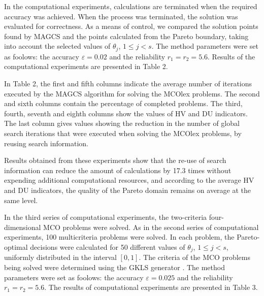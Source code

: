 \documentclass[smallextended]{svjour3}       %
\begin{document}
In the computational experiments, calculations are terminated when the required accuracy was achieved. When the process was terminated, the solution was evaluated for correctness. As a means of control, we compared the solution points found by MAGCS and the points calculated from the Pareto boundary, taking into account the selected values of $\theta_j$, $1 \leq j < s$. The method parameters were set as foolows: the accuracy $\varepsilon = 0.02$ and the reliability $r_1=r_2=5.6$. Results of the computational experiments are presented in Table 2.

In Table 2, the first and fifth columns indicate the average number of iterations executed by the MAGCS algorithm for solving the MCOlex problems. The second and sixth columns contain the percentage of completed problems. The third, fourth, seventh and eighth columns show the values of HV and DU indicators. The last column gives values showing the reduction in the number of global search iterations that were executed when solving the MCOlex problems, by reusing search information.


\begin{table}[ht]
\centering
\caption{Results of the series of experiments to solve two-dimensional two-criteria MCO problems}
\label{tab:2}
\end{table}


Results obtained from these experiments show that the re-use of search information can reduce the amount of calculations by 17.3 times without expending additional computational resources, and according to the average HV and DU indicators, the quality of the Pareto domain remains on average at the same level.

In the third series of computational experiments, the two-criteria four-dimensional MCO problems were solved. As in the second series of computational experiments, 100 multicriteria problems were solved. In each problem, the Pareto-optimal decisions were calculated for 50 different values of $\theta_j$, $1 \leq j <s$, uniformly distributed in the interval $[0,1]$. The criteria of the MCO problems being solved were determined using the GKLS generator \cite{c37}. The method parameters were set as foolows: the accuracy $\varepsilon = 0.025$ and the reliability $r_1=r_2=5.6$. The results of computational experiments are presented in Table 3.
\end{document}
